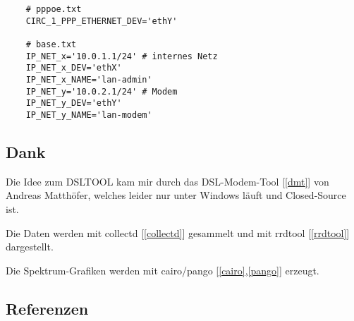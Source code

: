 
\begin{example}
\begin{verbatim}
    # pppoe.txt
    CIRC_1_PPP_ETHERNET_DEV='ethY'

    # base.txt
    IP_NET_x='10.0.1.1/24' # internes Netz
    IP_NET_x_DEV='ethX'
    IP_NET_x_NAME='lan-admin'
    IP_NET_y='10.0.2.1/24' # Modem 
    IP_NET_y_DEV='ethY'
    IP_NET_y_NAME='lan-modem'
\end{verbatim}
\end{example}

 
\subsection{Dank}

  Die Idee zum DSLTOOL kam mir durch das DSL-Modem-Tool {[\ref{dmt}]} von
  Andreas Matthöfer, welches leider nur unter Windows läuft und Closed-Source ist.

  Die Daten werden mit collectd {[\ref{collectd}]} gesammelt und mit 
  rrdtool {[\ref{rrdtool}]} dargestellt.
  
  Die Spektrum-Grafiken werden mit cairo/pango {[\ref{cairo},\ref{pango}]}
  erzeugt.
  
\subsection{Referenzen}

\begin{list}{\textbf{[]}}{}
  
  \item \label{wiki}
      
  \item \label{dmt}
  
  \item \label{collectd}
  
  \item \label{rrdtool}
  
  \item \label{cairo}
  
  \item \label{pango}
  
\end{list}
